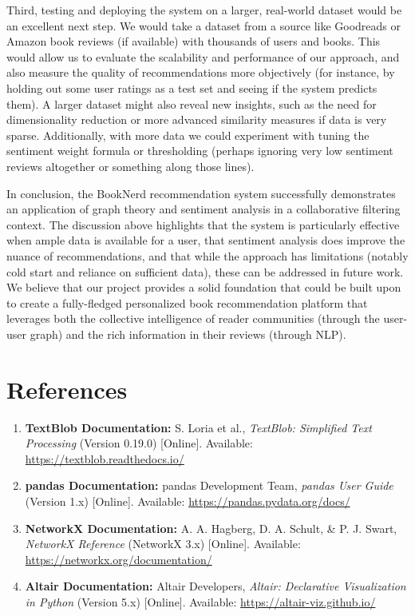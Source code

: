 \documentclass[11pt]{article}
\begin{document}
Third, testing and deploying the system on a larger, real-world dataset would be an excellent next step. We would take a dataset from a source like Goodreads or Amazon book reviews (if available) with thousands of users and books. This would allow us to evaluate the scalability and performance of our approach, and also measure the quality of recommendations more objectively (for instance, by holding out some user ratings as a test set and seeing if the system predicts them). A larger dataset might also reveal new insights, such as the need for dimensionality reduction or more advanced similarity measures if data is very sparse. Additionally, with more data we could experiment with tuning the sentiment weight formula or thresholding (perhaps ignoring very low sentiment reviews altogether or something along those lines).

In conclusion, the BookNerd recommendation system successfully demonstrates an application of graph theory and sentiment analysis in a collaborative filtering context. The discussion above highlights that the system is particularly effective when ample data is available for a user, that sentiment analysis does improve the nuance of recommendations, and that while the approach has limitations (notably cold start and reliance on sufficient data), these can be addressed in future work. We believe that our project provides a solid foundation that could be built upon to create a fully-fledged personalized book recommendation platform that leverages both the collective intelligence of reader communities (through the user-user graph) and the rich information in their reviews (through NLP).

\section*{References}
\begin{enumerate}
    \item \textbf{TextBlob Documentation:} S. Loria et al., \textit{TextBlob: Simplified Text Processing} (Version 0.19.0) [Online]. Available: \url{https://textblob.readthedocs.io/}
    \item \textbf{pandas Documentation:} pandas Development Team, \textit{pandas User Guide} (Version 1.x) [Online]. Available: \url{https://pandas.pydata.org/docs/}
    \item \textbf{NetworkX Documentation:} A. A. Hagberg, D. A. Schult, & P. J. Swart, \textit{NetworkX Reference} (NetworkX 3.x) [Online]. Available: \url{https://networkx.org/documentation/}
    \item \textbf{Altair Documentation:} Altair Developers, \textit{Altair: Declarative Visualization in Python} (Version 5.x) [Online]. Available: \url{https://altair-viz.github.io/}
\end{enumerate}
\end{document}
